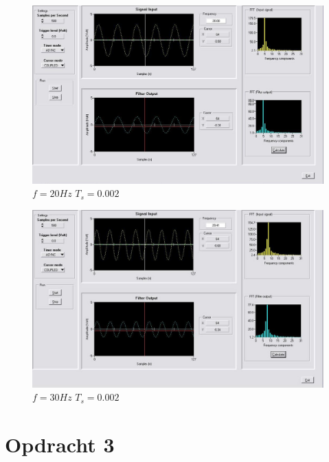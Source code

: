 \documentclass[10pt,a4paper]{article}
\begin{document}
\begin{enumerate}
    \begin{figure}[H]
    \includegraphics[scale=0.5]{500_20.JPG}
    \caption{$f=20Hz$ $T_{s}=0.002$}
    \end{figure}
    \begin{figure}[H]
    \includegraphics[scale=0.5]{500_30.JPG}
    \caption{$f=30Hz$ $T_{s}=0.002$}
    \end{figure}



\end{enumerate}


\section*{Opdracht 3} %
\label{sec:Opdracht 3}
\end{document}
